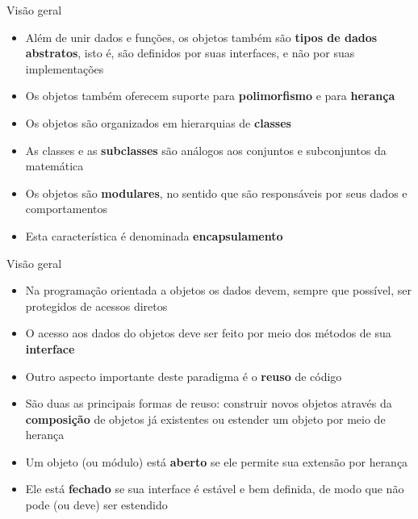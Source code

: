 \begin{frame}[fragile]{Visão geral}

    \begin{itemize}
        \item Além de unir dados e funções, os objetos também são \textbf{tipos de dados 
            abstratos}, isto é, são definidos por suas interfaces, e não por suas implementações

        \item Os objetos também oferecem suporte para \textbf{polimorfismo} e para \textbf{herança}

        \item Os objetos são organizados em hierarquias de \textbf{classes}

        \item As classes e as \textbf{subclasses} são análogos aos conjuntos e subconjuntos da
            matemática

        \item Os objetos são \textbf{modulares}, no sentido que são responsáveis por seus dados
            e comportamentos

        \item Esta característica é denominada \textbf{encapsulamento}
           
    \end{itemize}

\end{frame}

\begin{frame}[fragile]{Visão geral}

    \begin{itemize}
        \item Na programação orientada a objetos os dados devem, sempre que possível, ser protegidos
            de acessos diretos

        \item O acesso aos dados do objetos deve ser feito por meio dos métodos de sua
            \textbf{interface}
 
        \item Outro aspecto importante deste paradigma é o \textbf{reuso} de código

        \item São duas as principais formas de reuso: construir novos objetos através da
            \textbf{composição} de objetos já existentes ou estender um objeto por meio de 
            herança

        \item Um objeto (ou módulo) está \textbf{aberto} se ele permite sua extensão por herança

        \item Ele está \textbf{fechado} se sua interface é estável e bem definida, de modo que
            não pode (ou deve) ser estendido
    \end{itemize}

\end{frame}
